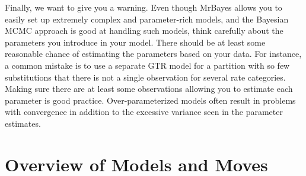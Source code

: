 \documentclass[12pt]{book}
\begin{document}
Finally, we want to give you a warning. Even though MrBayes allows you to easily set up extremely
complex and parameter-rich models, and the Bayesian MCMC approach is good at handling such models,
think carefully about the parameters you introduce in your model. There should be at least some
reasonable chance of estimating the parameters based on your data. For instance, a common mistake
is to use a separate GTR model for a partition with so few substitutions that there is not a single
observation for several rate categories. Making sure there are at least some observations allowing
you to estimate each parameter is good practice. Over-parameterized models often result in problems
with convergence in addition to the excessive variance seen in the parameter estimates.

\appendix
\chapter{Overview of Models and Moves}
\label{appendixOverview}
\end{document}
